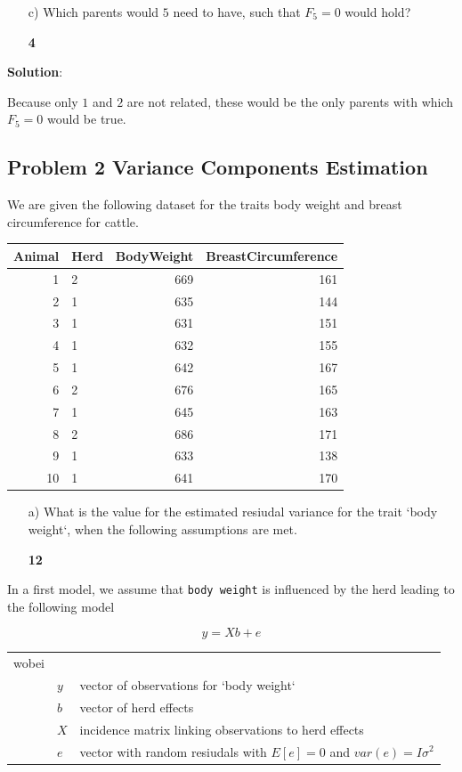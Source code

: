 \documentclass[]{article}
\newcommand{\points}[1]
{\begin{flushright}\textbf{#1}\end{flushright}}
\newcommand{\sol}
{\vspace{2ex}\textbf{Solution}:}
\begin{document}
\clearpage
\pagebreak

\begin{enumerate}
\item[c)] Which parents would $5$ need to have, such that $F_5 = 0$ would hold?
\points{4}
\end{enumerate}

\sol

Because only \(1\) and \(2\) are not related, these would be the only
parents with which \(F_5 = 0\) would be true.

\clearpage
\pagebreak

\subsection{Problem 2 Variance Components
Estimation}\label{problem-2-variance-components-estimation}

We are given the following dataset for the traits body weight and breast
circumference for cattle.

\begin{longtable}[]{@{}rlrr@{}}
\toprule
Animal & Herd & BodyWeight & BreastCircumference\tabularnewline
\midrule
\endhead
1 & 2 & 669 & 161\tabularnewline
2 & 1 & 635 & 144\tabularnewline
3 & 1 & 631 & 151\tabularnewline
4 & 1 & 632 & 155\tabularnewline
5 & 1 & 642 & 167\tabularnewline
6 & 2 & 676 & 165\tabularnewline
7 & 1 & 645 & 163\tabularnewline
8 & 2 & 686 & 171\tabularnewline
9 & 1 & 633 & 138\tabularnewline
10 & 1 & 641 & 170\tabularnewline
\bottomrule
\end{longtable}

\begin{enumerate}
\item[a)] What is the value for the estimated resiudal variance for the trait `body weight`, when the following assumptions are met.
\points{12}
\end{enumerate}

In a first model, we assume that \texttt{body\ weight} is influenced by
the herd leading to the following model

\[y = Xb + e\]

\begin{tabular}{lll}
wobei  &  & \\
       &  $y$  &  vector of observations for `body weight` \\
       &  $b$  &  vector of herd effects \\
       &  $X$  &  incidence matrix linking observations to herd effects \\
       &  $e$  &  vector with random resiudals with $E[e] = 0$ and $var(e) = I \sigma^2$
\end{tabular}
\end{document}
